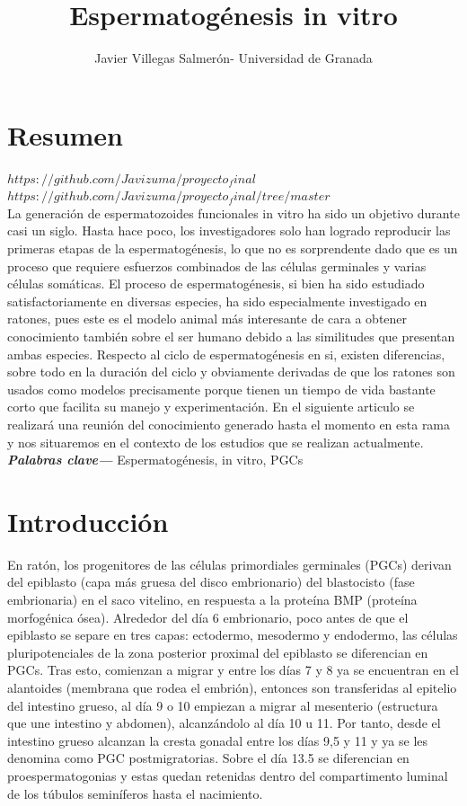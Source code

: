 \documentclass[a4paper,11pt]{article}
\providecommand{\keywords}[1]{\textbf{\textit{Palabras clave---}} #1}
\begin{document}
\title{Espermatogénesis in vitro}
\author{Javier Villegas Salmerón- Universidad de Granada}
\maketitle
\section{Resumen}
$https://github.com/Javizuma/proyecto_final$\\
$https://github.com/Javizuma/proyecto_final/tree/master$\\
La generación de espermatozoides funcionales in vitro ha sido un objetivo durante casi un siglo. Hasta hace poco, los investigadores solo han logrado reproducir las primeras etapas de la espermatogénesis, lo que no es sorprendente dado que es un proceso que requiere esfuerzos combinados de las células germinales y varias células somáticas.
El proceso de espermatogénesis, si bien ha sido estudiado satisfactoriamente en diversas especies, ha sido especialmente investigado en ratones, pues este es el modelo animal  más interesante de cara a obtener conocimiento también sobre el ser humano debido a las similitudes que presentan ambas especies. Respecto al ciclo de espermatogénesis en si, existen diferencias, sobre todo en la duración del ciclo y obviamente derivadas de que los ratones son usados como modelos  precisamente porque tienen un tiempo de vida bastante corto que facilita su manejo y experimentación. 
En el siguiente articulo se realizará una reunión del conocimiento generado hasta el momento en esta rama y nos situaremos en el contexto de los estudios que se realizan actualmente. 
\keywords{Espermatogénesis, in vitro, PGCs}
\section{Introducción}
En ratón, los progenitores de las células primordiales germinales (PGCs) derivan del epiblasto (capa más gruesa del disco embrionario) del blastocisto (fase embrionaria) en el saco vitelino, en respuesta a la proteína BMP (proteína morfogénica ósea). Alrededor del día 6 embrionario, poco antes de que el epiblasto se separe en tres capas: ectodermo, mesodermo y endodermo, las células pluripotenciales de la zona posterior proximal del epiblasto se diferencian en PGCs. Tras esto, comienzan a migrar y entre los días 7 y 8 ya se encuentran en el alantoides (membrana que rodea el embrión), entonces son transferidas al epitelio del intestino grueso,  al día 9 o 10 empiezan a migrar al mesenterio (estructura que une intestino y abdomen), alcanzándolo al día 10 u 11. Por tanto, desde el intestino grueso alcanzan la cresta gonadal entre los días 9,5 y 11 y ya se les denomina como PGC postmigratorias. Sobre el día 13.5 se diferencian en proespermatogonias y estas quedan retenidas dentro del compartimento luminal de los túbulos seminíferos hasta el nacimiento. 
\end{document}
